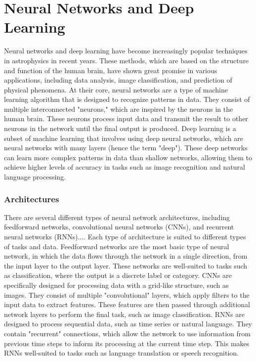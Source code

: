\section{Neural Networks and Deep Learning}
\label{s:Neural-Networks-and-Deep-Learning}

Neural networks and deep learning have become increasingly popular techniques in astrophysics in recent years. These methods, which are based on the structure and function of the human brain, have shown great promise in various applications, including data analysis, image classification, and prediction of physical phenomena. At their core, neural networks are a type of machine learning algorithm that is designed to recognize patterns in data. They consist of multiple interconnected "neurons," which are inspired by the neurons in the human brain. These neurons process input data and transmit the result to other neurons in the network until the final output is produced. Deep learning is a subset of machine learning that involves using deep neural networks, which are neural networks with many layers (hence the term "deep"). These deep networks can learn more complex patterns in data than shallow networks, allowing them to achieve higher levels of accuracy in tasks such as image recognition and natural language processing.

\subsubsection{Architectures}
There are several different types of neural network architectures, including feedforward networks, convolutional neural networks (CNNs), and recurrent neural networks (RNNs).... Each type of architecture is suited to different types of tasks and data. Feedforward networks are the most basic type of neural network, in which the data flows through the network in a single direction, from the input layer to the output layer. These networks are well-suited to tasks such as classification, where the output is a discrete label or category. CNNs are specifically designed for processing data with a grid-like structure, such as images. They consist of multiple "convolutional" layers, which apply filters to the input data to extract features. These features are then passed through additional network layers to perform the final task, such as image classification. RNNs are designed to process sequential data, such as time series or natural language. They contain "recurrent" connections, which allow the network to use information from previous time steps to inform its processing at the current time step. This makes RNNs well-suited to tasks such as language translation or speech recognition.

